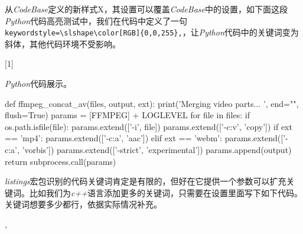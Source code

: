从\emph{CodeBase}定义的新样式X，其设置可以覆盖\emph{CodeBase}中的设置，如下面这段\emph{Python}代码高亮测试中，我们在代码中定义了一句\verb|keywordstyle=\slshape\color[RGB]{0,0,255},|，让\emph{Python}代码中的关键词变为斜体，其他代码环境不受影响。

\begin{latex}{}
[1]{\lstset{style=python}}{}
\end{latex}

\emph{Python}代码展示。

\begin{python}{}
def ffmpeg_concat_av(files, output, ext):
	print('Merging video parts... ', end="", flush=True)
	params = [FFMPEG] + LOGLEVEL
	for file in files:
		if os.path.isfile(file): params.extend(['-i', file])
	params.extend(['-c:v', 'copy'])
	if ext == 'mp4':
		params.extend(['-c:a', 'aac'])
	elif ext == 'webm':
		params.extend(['-c:a', 'vorbis'])
	params.extend(['-strict', 'experimental'])
	params.append(output)
	return subprocess.call(params)
\end{python}

\emph{listings}宏包识别的代码关键词肯定是有限的，但好在它提供一个参数可以扩充关键词。比如我们为\emph{c++}语言添加更多的关键词，只需要在设置里面写下如下代码。关键词想要多少都行，依据实际情况补充。

\begin{latex}{}
,
\end{latex}


